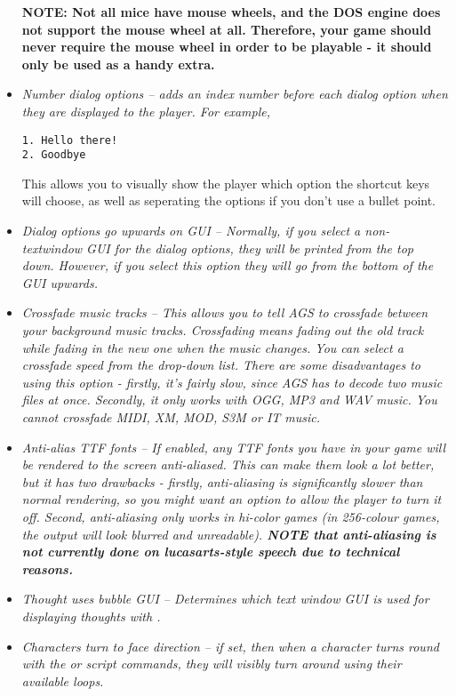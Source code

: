 \begin{itemize}
\bf{NOTE:} Not all mice have mouse wheels, and the DOS engine does not support the
mouse wheel at all. Therefore, your game should never require the mouse wheel in order to
be playable - it should only be used as a handy extra.
\item \it{Number dialog options} -- adds an index number before each dialog option when
they are displayed to the player. For example,
\begin{verbatim}
1. Hello there!
2. Goodbye
\end{verbatim}
This allows you to visually show the player which option the shortcut keys will choose,
as well as seperating the options if you don't use a bullet point.
\item \it{Dialog options go upwards on GUI} -- Normally, if you select a non-textwindow GUI
for the dialog options, they will be printed from the top down. However, if you select this
option they will go from the bottom of the GUI upwards.
\item \it{Crossfade music tracks} -- This allows you to tell AGS to crossfade between your
background music tracks. Crossfading means fading out the old track while fading in the
new one when the music changes. You can select a crossfade speed from the drop-down list.
There are some disadvantages to using this option - firstly, it's fairly slow, since AGS
has to decode two music files at once. Secondly, it only works with OGG, MP3 and WAV music.
You cannot crossfade MIDI, XM, MOD, S3M or IT music.
\item \it{Anti-alias TTF fonts} -- If enabled, any TTF fonts you have in your game will
be rendered to the screen anti-aliased. This can make them look a lot better, but it has
two drawbacks - firstly, anti-aliasing is significantly slower than normal rendering, so
you might want an option to allow the player to turn it off. Second, anti-aliasing only
works in hi-color games (in 256-colour games, the output will look blurred and unreadable).
\bf{NOTE} that anti-aliasing is not currently done on lucasarts-style speech due to
technical reasons.
\item \it{Thought uses bubble GUI} -- Determines which text window GUI is used for displaying
thoughts with .
\item \it{Characters turn to face direction} -- if set, then when a character turns round
with the  or
script commands, they will visibly turn around using their available loops.

\end{itemize}
